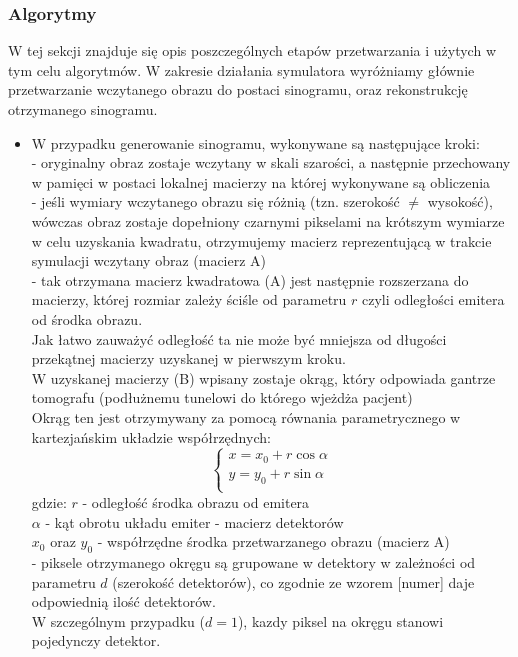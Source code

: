 \documentclass[A_4paper,12pt]{article}
\begin{document}
\subsubsection{Algorytmy}
W tej sekcji znajduje się opis poszczególnych etapów przetwarzania i użytych w tym celu algorytmów.
W zakresie działania symulatora wyróżniamy głównie przetwarzanie wczytanego obrazu do postaci sinogramu, oraz rekonstrukcję otrzymanego sinogramu.
\begin{itemize}
\item W przypadku generowanie sinogramu, wykonywane są następujące kroki: \\
- oryginalny obraz zostaje wczytany w skali szarości, a następnie przechowany w pamięci w postaci lokalnej macierzy na której wykonywane są obliczenia \\
- jeśli wymiary wczytanego obrazu się różnią (tzn. szerokość $\neq$ wysokość), wówczas obraz zostaje dopełniony czarnymi pikselami na krótszym wymiarze w celu uzyskania kwadratu, otrzymujemy macierz reprezentującą w trakcie symulacji wczytany obraz (macierz A) \\
- tak otrzymana macierz kwadratowa (A) jest następnie rozszerzana do macierzy, której rozmiar zależy ściśle od parametru $r$ czyli odległości emitera od środka obrazu. \\
Jak łatwo zauważyć odległość ta nie może być mniejsza od długości przekątnej macierzy uzyskanej w pierwszym kroku. \\
W uzyskanej macierzy (B) wpisany zostaje okrąg, który odpowiada gantrze tomografu (podłużnemu tunelowi do którego wjeżdża pacjent) \\
Okrąg ten jest otrzymywany za pomocą równania parametrycznego w kartezjańskim układzie współrzędnych: \\
\[
  \begin{cases}
   x = x_0 + r \cos \alpha \\
   y = y_0 + r \sin  \alpha \\
  \end{cases}
\]
gdzie:
$r$ - odległość środka obrazu od emitera \\
$\alpha$ - kąt obrotu układu emiter - macierz detektorów \\
$x_0$ oraz $y_0$ - współrzędne środka przetwarzanego obrazu (macierz A) \\

- piksele otrzymanego okręgu są grupowane w detektory w zależności od parametru $d$ (szerokość detektorów), co zgodnie ze wzorem [numer] daje odpowiednią ilość detektorów. \\ W szczególnym przypadku ($d=1$), kazdy piksel na okręgu stanowi pojedynczy detektor. \\


\end{itemize}
\end{document}
